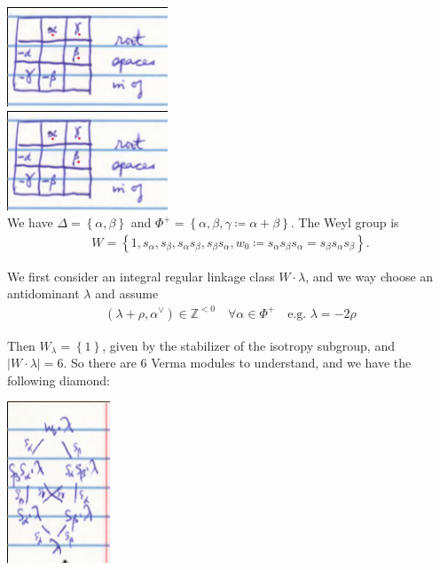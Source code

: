 \documentclass[11pt]{scrartcl}
\theoremstyle{definition}
\theoremstyle{theorem}
\theoremstyle{proof}
\theoremstyle{definition}
\theoremstyle{break}
\theoremstyle{problem}
\newcommand{\ZZ}[0]{{\mathbb{Z}}}
\newcommand{\abs}[1]{{\left\lvert {#1} \right\rvert}}
\newcommand{\definedas}[0]{\coloneqq}
\newcommand{\dual}[0]{^\vee}
\newcommand{\theset}[1]{\left\{{#1}\right\}}
\begin{document}
\includegraphics{figures/2020-04-01-09:29.png}\\

\includegraphics{figures/2020-04-01-09:29.png}\\

We have \(\Delta = \theset{\alpha, \beta}\) and
\(\Phi^+ = \theset{\alpha, \beta, \gamma\definedas \alpha+\beta}\). The
Weyl group is
\begin{align*}
W = \theset{1, s_\alpha,s_\beta, s_\alpha s_\beta, s_\beta s_\alpha, w_0\definedas s_\alpha s_\beta s_\alpha = s_\beta s_\alpha s_\beta  }
.\end{align*}

We first consider an integral regular linkage class \(W\cdot \lambda\),
and we way choose an antidominant \(\lambda\) and assume
\begin{align*}
(\lambda + \rho, \alpha\dual) \in \ZZ^{< 0} \quad \forall \alpha \in \Phi^+ \quad \text{e.g. } \lambda = - 2\rho
\end{align*}

Then \(W_\lambda = \theset{1}\), given by the stabilizer of the isotropy
subgroup, and \(\abs{W\cdot \lambda} = 6\). So there are 6 Verma modules
to understand, and we have the following diamond:

\includegraphics{figures/2020-04-01-09:33.png}\\
\end{document}
